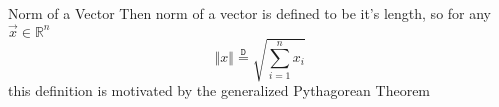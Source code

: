 \documentclass{standalone}
\begin{document}
\begin{defn*}{Norm of a Vector}
  Then norm of a vector is defined to be it's length, so for any $ \vec{x} \in \mathbb{R} ^{n}$ 
  \[
  \left\Vert x \right\Vert \stackrel{\mathtt{D}}{=} \sqrt{\sum_{i=1}^{n} x_{i}}
  \]
  this definition is motivated by the generalized Pythagorean Theorem
\end{defn*}
\end{document}
